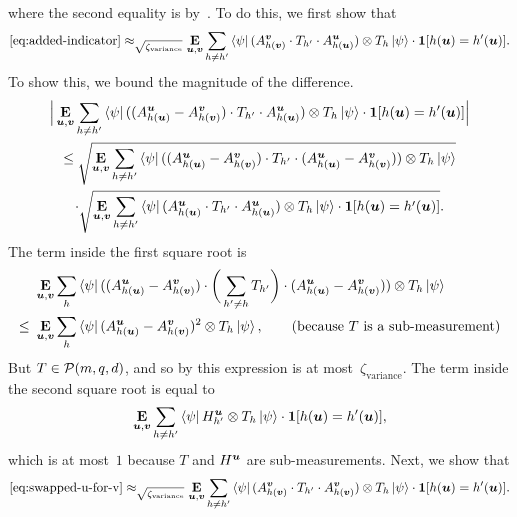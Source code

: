where the second equality is by~.
To do this, we first show that
\begin{equation}\label{eq:swapped-u-for-v}
\eqref{eq:added-indicator}
\approx_{\sqrt{\zeta_{\mathrm{variance}}}}
\mathop{\bf E\/}_{\boldsymbol{u},\boldsymbol{v}} \sum_{h \neq h'} \bra{\psi}  (A^{\boldsymbol{v}}_{h(\boldsymbol{v})} \cdot T_{h'} \cdot A^{\boldsymbol{u}}_{h(\boldsymbol{u})}) \otimes T_h \ket{\psi} \cdot \boldsymbol{1}[h(\boldsymbol{u}) = h'(\boldsymbol{u})].
\end{equation}
To show this, we bound the magnitude of the difference.
\begin{multline}
\Big|\mathop{\bf E\/}_{\boldsymbol{u},\boldsymbol{v}} \sum_{h \neq h'} \bra{\psi} ( (A^{\boldsymbol{u}}_{h(\boldsymbol{u})} - A^{\boldsymbol{v}}_{h(\boldsymbol{v})}) \cdot T_{h'} \cdot A^{\boldsymbol{u}}_{h(\boldsymbol{u})}) \otimes T_h \ket{\psi} \cdot \boldsymbol{1}[h(\boldsymbol{u}) = h'(\boldsymbol{u})]\Big|\\
\leq
\sqrt{\mathop{\bf E\/}_{\boldsymbol{u},\boldsymbol{v}} \sum_{h \neq h'} \bra{\psi}  ( (A^{\boldsymbol{u}}_{h(\boldsymbol{u})} - A^{\boldsymbol{v}}_{h(\boldsymbol{v})}) \cdot T_{h'} \cdot (A^{\boldsymbol{u}}_{h(\boldsymbol{u})} - A^{\boldsymbol{v}}_{h(\boldsymbol{v})})) \otimes T_h\ket{\psi}}\\
\cdot \sqrt{\mathop{\bf E\/}_{\boldsymbol{u},\boldsymbol{v}} \sum_{h \neq h'} \bra{\psi} (A^{\boldsymbol{u}}_{h(\boldsymbol{u})} \cdot T_{h'} \cdot A^{\boldsymbol{u}}_{h(\boldsymbol{u})}) \otimes T_h\ket{\psi} \cdot \boldsymbol{1}[h(\boldsymbol{u}) = h'(\boldsymbol{u})]}. \label{eq:swapped-u-for-cauchy-schwarz}
\end{multline}
The term inside the first square root is
\begin{align*}
&\mathop{\bf E\/}_{\boldsymbol{u},\boldsymbol{v}} \sum_{h} \bra{\psi} ( (A^{\boldsymbol{u}}_{h(\boldsymbol{u})} - A^{\boldsymbol{v}}_{h(\boldsymbol{v})}) \cdot \bigg(\sum_{h' \neq h} T_{h'}\bigg) \cdot (A^{\boldsymbol{u}}_{h(\boldsymbol{u})} - A^{\boldsymbol{v}}_{h(\boldsymbol{v})})) \otimes T_h\ket{\psi}\\
\leq~& \mathop{\bf E\/}_{\boldsymbol{u},\boldsymbol{v}} \sum_{h} \bra{\psi}  (A^{\boldsymbol{u}}_{h(\boldsymbol{u})} - A^{\boldsymbol{v}}_{h(\boldsymbol{v})})^2 \otimes T_h\ket{\psi},\tag{because $T$ is a sub-measurement}
\end{align*}
But $T \in \mathcal{P}(m, q, d)$, and so by  this expression is at most~$\zeta_{\mathrm{variance}}$.
The term inside the second square root is equal to
\begin{equation*}
\mathop{\bf E\/}_{\boldsymbol{u},\boldsymbol{v}} \sum_{h \neq h'} \bra{\psi}  H^{\boldsymbol{u}}_{h'} \otimes T_h \ket{\psi} \cdot \boldsymbol{1}[h(\boldsymbol{u}) = h'(\boldsymbol{u})],
\end{equation*}
which is at most~$1$ because $T$ and $H^{\boldsymbol{u}}$ are sub-measurements.
Next, we show that
\begin{equation}\label{eq:swapped-u-for-v-this-time-it's-personal}
\eqref{eq:swapped-u-for-v}
\approx_{\sqrt{\zeta_{\mathrm{variance}}}}
\mathop{\bf E\/}_{\boldsymbol{u},\boldsymbol{v}} \sum_{h \neq h'} \bra{\psi}  (A^{\boldsymbol{v}}_{h(\boldsymbol{v})} \cdot T_{h'} \cdot A^{\boldsymbol{v}}_{h(\boldsymbol{v})}) \otimes T_h \ket{\psi} \cdot \boldsymbol{1}[h(\boldsymbol{u}) = h'(\boldsymbol{u})].
\end{equation}
